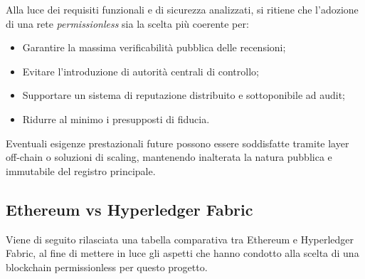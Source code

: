         \noindent Alla luce dei requisiti funzionali e di sicurezza analizzati, si ritiene che l'adozione di una rete \textit{permissionless} sia la scelta più coerente per:
            \begin{itemize}
                \item Garantire la massima verificabilità pubblica delle recensioni;
                
                \item Evitare l'introduzione di autorità centrali di controllo;
                
                \item Supportare un sistema di reputazione distribuito e sottoponibile ad audit;
                
                \item Ridurre al minimo i presupposti di fiducia.
            \end{itemize}

        \noindent Eventuali esigenze prestazionali future possono essere soddisfatte tramite layer off-chain o soluzioni di scaling, mantenendo inalterata la natura pubblica e immutabile del registro principale. \\
        
        \subsection{Ethereum vs Hyperledger Fabric}
            Viene di seguito rilasciata una tabella comparativa tra Ethereum e Hyperledger Fabric, al fine di mettere in luce gli aspetti che hanno condotto alla scelta di una blockchain permissionless per questo progetto.
    
